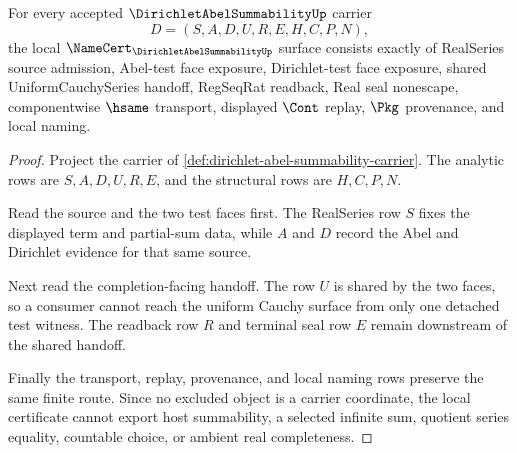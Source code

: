 \begin{theorem}
\label{thm:dirichlet-abel-summability-namecert-obligations}
For every accepted $\DirichletAbelSummabilityUp$ carrier
$$
D=(S,A,D,U,R,E,H,C,P,N),
$$
the local $\NameCert_{\DirichletAbelSummabilityUp}$ surface consists exactly of RealSeries source admission, Abel-test face exposure, Dirichlet-test face exposure, shared UniformCauchySeries handoff, RegSeqRat readback, Real seal nonescape, componentwise $\hsame$ transport, displayed $\Cont$ replay, $\Pkg$ provenance, and local naming.
\end{theorem}
\begin{proof}
Project the carrier of \autoref{def:dirichlet-abel-summability-carrier}. The analytic rows are $S,A,D,U,R,E$, and the structural rows are $H,C,P,N$.

Read the source and the two test faces first. The RealSeries row $S$ fixes the displayed term and partial-sum data, while $A$ and $D$ record the Abel and Dirichlet evidence for that same source.

Next read the completion-facing handoff. The row $U$ is shared by the two faces, so a consumer cannot reach the uniform Cauchy surface from only one detached test witness. The readback row $R$ and terminal seal row $E$ remain downstream of the shared handoff.

Finally the transport, replay, provenance, and local naming rows preserve the same finite route. Since no excluded object is a carrier coordinate, the local certificate cannot export host summability, a selected infinite sum, quotient series equality, countable choice, or ambient real completeness.
\end{proof}

